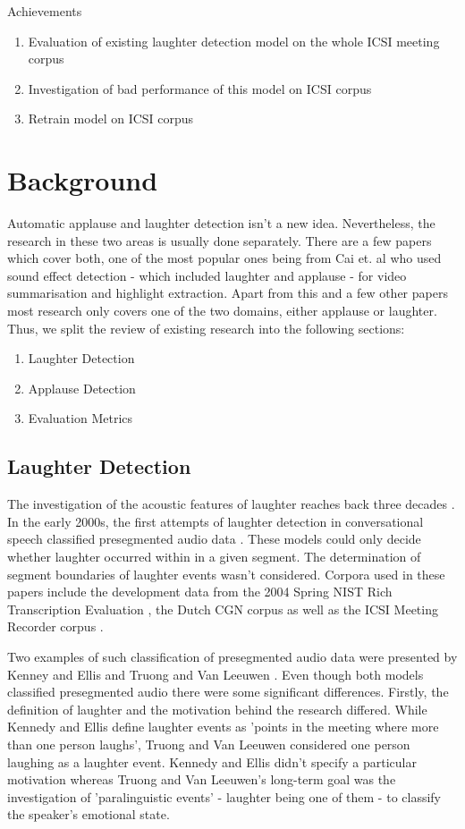 \documentclass[bsc,frontabs,parskip,deptreport]{infthesis}
\begin{document}
Achievements
\begin{enumerate}
  \item Evaluation of existing laughter detection model on the whole ICSI meeting corpus
  \item Investigation of bad performance of this model on ICSI corpus
  \item Retrain model on ICSI corpus
\end{enumerate}

\chapter{Background} \label{cha:bg}
Automatic applause and laughter detection isn't a new idea. Nevertheless, the research in these two areas is usually done separately. There are a few papers which cover both, one of the most popular ones being from Cai et. al \cite{cai2003highlight} who used sound effect detection - which included laughter and applause - for video summarisation and highlight extraction.
Apart from this and a few other papers most research only covers one of the two domains, either applause or laughter. Thus, we split the review of existing research into the following sections:
\begin{enumerate}
  \item Laughter Detection
  \item Applause Detection
  \item Evaluation Metrics 
\end{enumerate}


\section{Laughter Detection} \label{sec:bg-laughter}
The investigation of the acoustic features of laughter reaches back three decades \cite{bickley1992acoustic}.
In the early 2000s, the first attempts of laughter detection in conversational speech classified presegmented audio data \cite{kennedy2004laughter, truong2005automatic}. These models could only decide whether laughter occurred within in a given segment. The determination of segment boundaries of laughter events wasn't considered. 
Corpora used in these papers include the development data from the 2004 Spring NIST Rich Transcription Evaluation \cite{ldcnistcorpus}, the Dutch CGN corpus \cite{oostdijk2000spoken} as well as the ICSI Meeting Recorder corpus \cite{morgan2001meeting}. 

Two examples of such classification of presegmented audio data were presented by Kenney and Ellis \cite{kennedy2004laughter} and Truong and Van Leeuwen \cite{truong2005automatic}. 
Even though both models classified presegmented audio there were some significant differences. 
Firstly, the definition of laughter and the motivation behind the research differed.
While Kennedy and Ellis define laughter events as 'points in the meeting where more than one person laughs', Truong and Van Leeuwen considered one person laughing as a laughter event.
Kennedy and Ellis didn't specify a particular motivation whereas Truong and Van Leeuwen's long-term goal was the investigation of 'paralinguistic events' - laughter being one of them - to classify the speaker's emotional state.   
\end{document}

